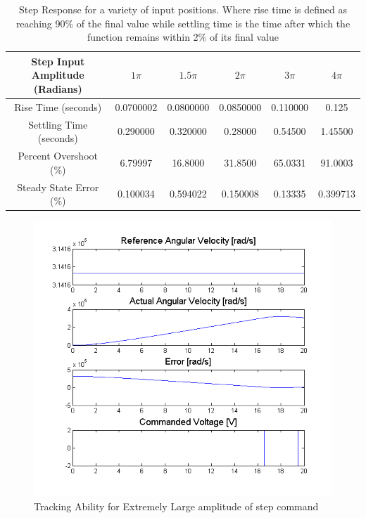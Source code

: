 \documentclass{article}
\theoremstyle{plain}
\theoremstyle{definition}
\theoremstyle{remark}
\begin{document}
\begin{table}[htb]
\begin{center}
    \begin{tabular}{|c|c|c|c|c|c|}
        \hline
        Step Input Amplitude (Radians) & $1\pi$   & $1.5 \pi$ & $2\pi$   & $3\pi$   & $4\pi$   \\ \hline
        Rise Time (seconds)            & 0.0700002 & 0.0800000   & 0.0850000 & 0.110000 & 0.125    \\ 
        Settling Time (seconds)        & 0.290000   & 0.320000    & 0.28000   & 0.54500  & 1.45500  \\ 
        Percent Overshoot (\%)          & 6.79997   & 16.8000     & 31.8500   & 65.0331  & 91.0003  \\ 
        Steady State Error (\%)         & 0.100034  & 0.594022    & 0.150008  & 0.13335  & 0.399713 \\
        \hline
    \end{tabular}
\end{center}
\caption{Step Response for a variety of input positions.  Where rise time is defined as reaching 90\% of the final value while settling time is the time after which the function remains within 2\% of its final value}
\label{q5_b6}
\end{table}

\begin{figure}[htb]
\begin{center}
\includegraphics[width = 16cm]{q5b.png}
\caption{Tracking Ability for Extremely Large amplitude of step command}
\label{q5_b0}
\end{center}
\end{figure}
\end{document}
